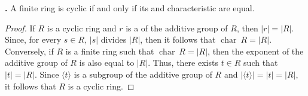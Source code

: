 \documentclass[12pt]{article}
\begin{document}
{\bf {}.}  A finite ring is cyclic if and only if its  and characteristic are equal.  

\begin{proof}
If $R$ is a cyclic ring and $r$ is a  of the additive group of $R$, then $|r|=|R|$.  Since, for every $s \in R$, $|s|$ divides $|R|$, then it follows that $\operatorname{char}~R=|R|$.  Conversely, if $R$ is a finite ring such that $\operatorname{char}~R=|R|$, then the exponent of the additive group of $R$ is also equal to $|R|$.  Thus, there exists $t \in R$ such that $|t|=|R|$.  Since $\langle t \rangle$ is a subgroup of the additive group of $R$ and $|\langle t \rangle |=|t|=|R|$, it follows that $R$ is a cyclic ring.\end{proof}
\end{document}
